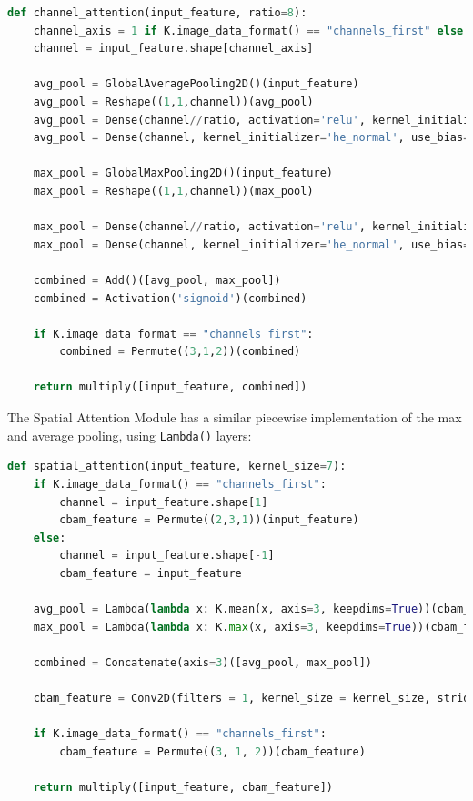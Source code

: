 \documentclass{article}
\begin{document}
\begin{lstlisting}[language=Python]
def channel_attention(input_feature, ratio=8):
    channel_axis = 1 if K.image_data_format() == "channels_first" else -1
    channel = input_feature.shape[channel_axis]

    avg_pool = GlobalAveragePooling2D()(input_feature)
    avg_pool = Reshape((1,1,channel))(avg_pool)
    avg_pool = Dense(channel//ratio, activation='relu', kernel_initializer='he_normal', use_bias=True, bias_initializer='zeros')(avg_pool)
    avg_pool = Dense(channel, kernel_initializer='he_normal', use_bias=True, bias_initializer='zeros')(avg_pool)

    max_pool = GlobalMaxPooling2D()(input_feature)
    max_pool = Reshape((1,1,channel))(max_pool)

    max_pool = Dense(channel//ratio, activation='relu', kernel_initializer='he_normal', use_bias=True, bias_initializer='zeros')(max_pool)
    max_pool = Dense(channel, kernel_initializer='he_normal', use_bias=True, bias_initializer='zeros')(max_pool)

    combined = Add()([avg_pool, max_pool])
    combined = Activation('sigmoid')(combined)

    if K.image_data_format == "channels_first":
        combined = Permute((3,1,2))(combined)

    return multiply([input_feature, combined]) 
\end{lstlisting}

The Spatial Attention Module has a similar piecewise implementation of the max and average pooling, using \lstinline{Lambda()} layers:

\begin{lstlisting}[language=Python]
def spatial_attention(input_feature, kernel_size=7):
    if K.image_data_format() == "channels_first":
        channel = input_feature.shape[1]
        cbam_feature = Permute((2,3,1))(input_feature)
    else:
        channel = input_feature.shape[-1]
        cbam_feature = input_feature

    avg_pool = Lambda(lambda x: K.mean(x, axis=3, keepdims=True))(cbam_feature)
    max_pool = Lambda(lambda x: K.max(x, axis=3, keepdims=True))(cbam_feature)

    combined = Concatenate(axis=3)([avg_pool, max_pool])

    cbam_feature = Conv2D(filters = 1, kernel_size = kernel_size, strides=1, padding='same', activation='sigmoid', kernel_initializer='he_normal', use_bias=False)(combined)

    if K.image_data_format() == "channels_first":
        cbam_feature = Permute((3, 1, 2))(cbam_feature)

    return multiply([input_feature, cbam_feature])
\end{lstlisting}
\end{document}
